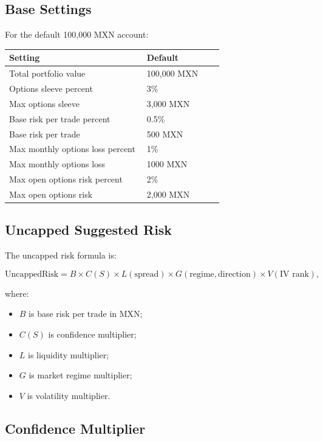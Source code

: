 \documentclass[11pt]{article}
\begin{document}
\subsection{Base Settings}

For the default 100,000 MXN account:

\begin{longtable}{p{0.45\linewidth} p{0.25\linewidth}}
\toprule
\textbf{Setting} & \textbf{Default} \\
\midrule
Total portfolio value & 100,000 MXN \\
Options sleeve percent & 3\% \\
Max options sleeve & 3,000 MXN \\
Base risk per trade percent & 0.5\% \\
Base risk per trade & 500 MXN \\
Max monthly options loss percent & 1\% \\
Max monthly options loss & 1000 MXN \\
Max open options risk percent & 2\% \\
Max open options risk & 2,000 MXN \\
\bottomrule
\end{longtable}

\subsection{Uncapped Suggested Risk}

The uncapped risk formula is:

\begin{equation}
\text{UncappedRisk}
= B \times C(S) \times L(\text{spread}) \times G(\text{regime}, \text{direction}) \times V(\text{IV rank}),
\end{equation}

where:

\begin{itemize}[noitemsep]
  \item \(B\) is base risk per trade in MXN;
  \item \(C(S)\) is confidence multiplier;
  \item \(L\) is liquidity multiplier;
  \item \(G\) is market regime multiplier;
  \item \(V\) is volatility multiplier.
\end{itemize}

\subsection{Confidence Multiplier}
\end{document}
